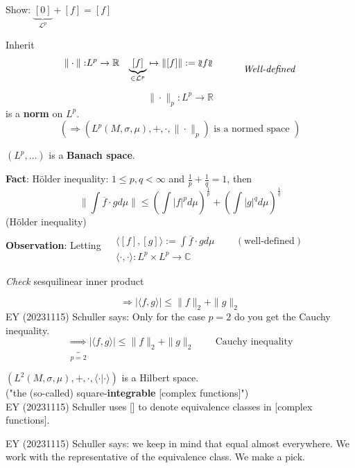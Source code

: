 Show: $\underbrace{[0]}_{\mathcal{L}^p} + [f] = [f]$

Inherit 
\[
\begin{aligned} 
	\| \cdot \| : & L^p \to \mathbb{R}
& \underbrace{[f]}_{ \in \mathcal{L}^p } \mapsto \| [f] \| := \mathopen{\wr\mkern-2mu\wr}f\mathclose{\wr\mkern-2mu\wr}  
\end{aligned}	\quad \quad \quad \, \text{\emph{Well-defined}}
\]

\begin{theorem}	
	\[
	\| \cdot \|_p : L^p \to \mathbb{R}
	\] is a \textbf{norm} on $L^p$.
	\[
	(\Longrightarrow (L^p(M, \sigma, \mu), + , \cdot , \| \cdot \|_p ) \text{ is a normed space } )
	\]
\end{theorem}
\begin{theorem}
	$(L^p, \dots)$ is a \textbf{Banach space}.
\end{theorem}
\textbf{Fact}: H\"{o}lder inequality: $1 \leq p,q < \infty$ and $\frac{1}{p} + \frac{1}{q} = 1$, then
\[
\| \int \overline{f}\cdot g d\mu \| \leq  \left( \int |f|^p d\mu \right)^{\frac{1}{p}} + \left( \int |g|^q d\mu \right)^{\frac{1}{q}}
\]
(H\"{o}lder inequality) \\

\textbf{Observation}: Letting $\begin{aligned}
& 	\quad \\ 
& \langle [f], [g] \rangle := \int \overline{f}\cdot g d\mu \quad \quad \, (\text{well-defined}) \\
& \langle \cdot, \cdot \rangle : L^p \times L^p \to \mathbb{C} 
\end{aligned}$

\emph{Check} sesquilinear inner product

\[
\Longrightarrow |\langle f, g \rangle | \leq \| f \|_2 + \| g \|_2
\]
EY (20231115) Schuller says: Only for the case $p=2$ do you get the Cauchy inequality.
\[
\underbrace{\Longrightarrow}_{p = 2} |\langle f, g \rangle | \leq \| f \|_2 + \| g \|_2 \quad \quad \, \text{Cauchy inequality}
\]

\begin{theorem}
	$(L^2(M, \sigma, \mu), +, \cdot, \langle \cdot | \cdot \rangle)$ is a Hilbert space. \\

	("the (so-called) square-\textbf{integrable} [complex functions]") \\

EY (20231115) Schuller uses [] to denote equivalence classes in [complex functions].
\end{theorem}

EY (20231115) Schuller says: we keep in mind that equal almost everywhere. We work with the representative of the equivalence class. We make a pick.

